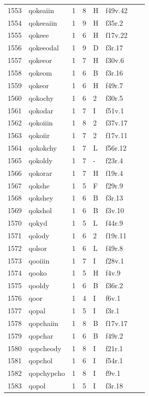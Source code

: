 \documentclass[11pt,a4paper]{article}
\begin{document}
\begin{landscape}
\begin{longtable}{@{}r>{\ttfamily}lrrl>{\ttfamily}l>{\raggedright\arraybackslash}p{80mm}>{\raggedright\arraybackslash}p{36mm}@{}}
1553 & qokeaiin & 1 & 8 & H & f49v.42 &  & \\
1554 & qokeeaiin & 1 & 9 & H & f35r.2 &  & \\
1555 & qokeee & 1 & 6 & H & f17v.22 &  & \\
1556 & qokeeodal & 1 & 9 & D & f3r.17 &  & \\
1557 & qokeeor & 1 & 7 & H & f30v.6 &  & \\
1558 & qokeom & 1 & 6 & B & f3r.16 &  & \\
1559 & qokeor & 1 & 6 & H & f49r.7 &  & \\
1560 & qokochy & 1 & 6 & 2 & f30r.5 &  & \\
1561 & qokodar & 1 & 7 & I & f51v.1 &  & \\
1562 & qokoiiin & 1 & 8 & 2 & f37v.17 &  & \\
1563 & qokoiir & 1 & 7 & 2 & f17v.11 &  & \\
1564 & qokokchy & 1 & 7 & L & f56r.12 &  & \\
1565 & qokoldy & 1 & 7 & - & f23r.4 &  & \\
1566 & qokorar & 1 & 7 & H & f19r.4 &  & \\
1567 & qokshe & 1 & 5 & F & f29r.9 &  & \\
1568 & qokshey & 1 & 6 & B & f3r.13 &  & \\
1569 & qokshol & 1 & 6 & B & f3v.10 &  & \\
1570 & qokyd & 1 & 5 & L & f44r.9 &  & \\
1571 & qolody & 1 & 6 & 2 & f19r.11 &  & \\
1572 & qolsor & 1 & 6 & L & f49r.8 &  & \\
1573 & qooiiin & 1 & 7 & I & f28v.1 &  & \\
1574 & qooko & 1 & 5 & H & f4v.9 &  & \\
1575 & qooldy & 1 & 6 & B & f36r.2 &  & \\
1576 & qoor & 1 & 4 & I & f6v.1 &  & \\
1577 & qopal & 1 & 5 & I & f3r.1 &  & \\
1578 & qopchaiin & 1 & 8 & B & f17v.17 &  & \\
1579 & qopchar & 1 & 6 & B & f49r.2 &  & \\
1580 & qopcheody & 1 & 8 & I & f21r.1 &  & \\
1581 & qopchol & 1 & 6 & I & f54r.1 &  & \\
1582 & qopchypcho & 1 & 8 & I & f9v.1 &  & \\
1583 & qopol & 1 & 5 & I & f3r.18 &  & \\

\end{longtable}
\end{landscape}
\end{document}
